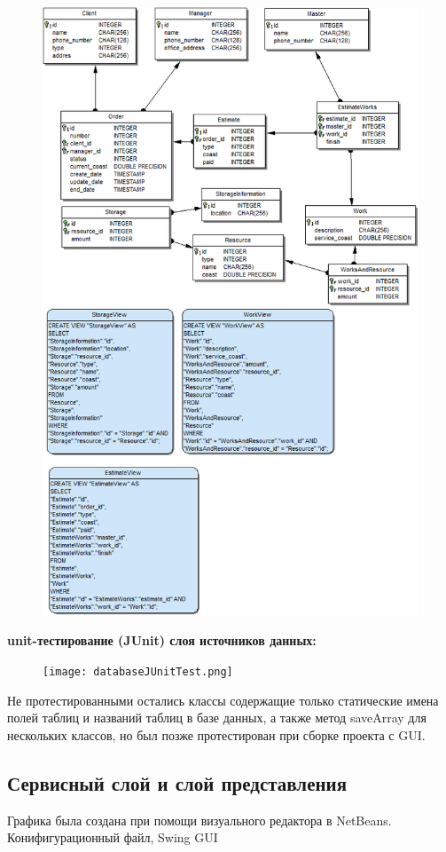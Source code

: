 \documentclass[12pt,a4paper,titlepage]{article}
\begin{document}
\begin{figure}[!ht]
\includegraphics[scale=0.6]{database.png}\caption{}
\end{figure}
\newpage
\textbf{unit-тестирование (JUnit) слоя источников данных:}
\begin{figure}[!ht]
\texttt{[image: databaseJUnitTest.png]}\caption{}
\end{figure}

Не протестированными остались классы содержащие только статические 
имена полей таблиц и названий таблиц в базе данных, а также метод saveArray для нескольких классов, но был позже протестирован при сборке проекта с GUI.
\newpage
\subsection{Сервисный слой и слой представления}
Графика была создана при помощи визуального редактора в NetBeans.
Конифигурационный файл, Swing GUI 
\end{document}

